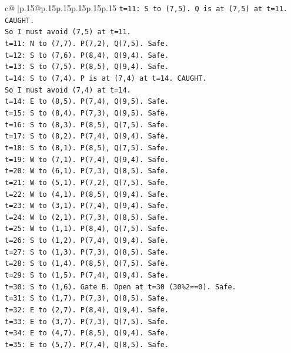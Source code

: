 \documentclass{article}
\begin{document}
{\begin{supertabular}{c@{$\;$}|p{.15\linewidth}@{}p{.15\linewidth}p{.15\linewidth}p{.15\linewidth}p{.15\linewidth}p{.15\linewidth}}
{{{\texttt{t=11: S to (7,5). Q is at (7,5) at t=11. CAUGHT.} \\
\texttt{So I must avoid (7,5) at t=11.} \\
\texttt{t=11: N to (7,7). P(7,2), Q(7,5). Safe.} \\
\texttt{t=12: S to (7,6). P(8,4), Q(9,4). Safe.} \\
\texttt{t=13: S to (7,5). P(8,5), Q(9,4). Safe.} \\
\texttt{t=14: S to (7,4). P is at (7,4) at t=14. CAUGHT.} \\
\texttt{So I must avoid (7,4) at t=14.} \\
\texttt{t=14: E to (8,5). P(7,4), Q(9,5). Safe.} \\
\texttt{t=15: S to (8,4). P(7,3), Q(9,5). Safe.} \\
\texttt{t=16: S to (8,3). P(8,5), Q(7,5). Safe.} \\
\texttt{t=17: S to (8,2). P(7,4), Q(9,4). Safe.} \\
\texttt{t=18: S to (8,1). P(8,5), Q(7,5). Safe.} \\
\texttt{t=19: W to (7,1). P(7,4), Q(9,4). Safe.} \\
\texttt{t=20: W to (6,1). P(7,3), Q(8,5). Safe.} \\
\texttt{t=21: W to (5,1). P(7,2), Q(7,5). Safe.} \\
\texttt{t=22: W to (4,1). P(8,5), Q(9,4). Safe.} \\
\texttt{t=23: W to (3,1). P(7,4), Q(9,4). Safe.} \\
\texttt{t=24: W to (2,1). P(7,3), Q(8,5). Safe.} \\
\texttt{t=25: W to (1,1). P(8,4), Q(7,5). Safe.} \\
\texttt{t=26: S to (1,2). P(7,4), Q(9,4). Safe.} \\
\texttt{t=27: S to (1,3). P(7,3), Q(8,5). Safe.} \\
\texttt{t=28: S to (1,4). P(8,5), Q(7,5). Safe.} \\
\texttt{t=29: S to (1,5). P(7,4), Q(9,4). Safe.} \\
\texttt{t=30: S to (1,6). Gate B. Open at t=30 (30\%2==0). Safe.} \\
\texttt{t=31: S to (1,7). P(7,3), Q(8,5). Safe.} \\
\texttt{t=32: E to (2,7). P(8,4), Q(9,4). Safe.} \\
\texttt{t=33: E to (3,7). P(7,3), Q(7,5). Safe.} \\
\texttt{t=34: E to (4,7). P(8,5), Q(9,4). Safe.} \\
\texttt{t=35: E to (5,7). P(7,4), Q(8,5). Safe.} \\
}}}
\end{supertabular}}
\end{document}
